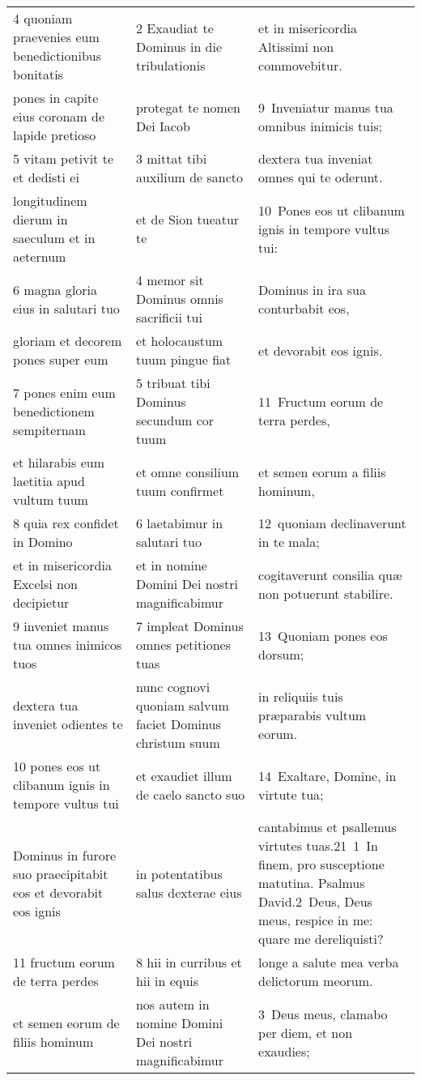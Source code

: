 \documentclass{article}
\begin{document}
\begin{longtable}{@{}p{}p{}p{}@{}}
4 quoniam praevenies eum benedictionibus bonitatis	&	2 Exaudiat te Dominus in die tribulationis	&	et in misericordia Altissimi non commovebitur.	\\
pones in capite eius coronam de lapide pretioso	&	protegat te nomen Dei Iacob	&	9 Inveniatur manus tua omnibus inimicis tuis;	\\
5 vitam petivit te et dedisti ei	&	3 mittat tibi auxilium de sancto	&	dextera tua inveniat omnes qui te oderunt.	\\
longitudinem dierum in saeculum et in aeternum	&	et de Sion tueatur te	&	10 Pones eos ut clibanum ignis in tempore vultus tui:	\\
6 magna gloria eius in salutari tuo	&	4 memor sit Dominus omnis sacrificii tui	&	Dominus in ira sua conturbabit eos,	\\
gloriam et decorem pones super eum	&	et holocaustum tuum pingue fiat	&	et devorabit eos ignis.	\\
7 pones enim eum benedictionem sempiternam	&	5 tribuat tibi Dominus secundum cor tuum	&	11 Fructum eorum de terra perdes,	\\
et hilarabis eum laetitia apud vultum tuum	&	et omne consilium tuum confirmet	&	et semen eorum a filiis hominum,	\\
8 quia rex confidet in Domino	&	6 laetabimur in salutari tuo	&	12 quoniam declinaverunt in te mala;	\\
et in misericordia Excelsi non decipietur	&	et in nomine Domini Dei nostri magnificabimur	&	cogitaverunt consilia quæ non potuerunt stabilire.	\\
9 inveniet manus tua omnes inimicos tuos	&	7 impleat Dominus omnes petitiones tuas	&	13 Quoniam pones eos dorsum;	\\
dextera tua inveniet odientes te	&	nunc cognovi quoniam salvum faciet Dominus christum suum	&	in reliquiis tuis præparabis vultum eorum.	\\
10 pones eos ut clibanum ignis in tempore vultus tui	&	et exaudiet illum de caelo sancto suo	&	14 Exaltare, Domine, in virtute tua;	\\
Dominus in furore suo praecipitabit eos et devorabit eos ignis	&	in potentatibus salus dexterae eius	&	cantabimus et psallemus virtutes tuas.21 1 In finem, pro susceptione matutina. Psalmus David.2 Deus, Deus meus, respice in me: quare me dereliquisti?	\\
11 fructum eorum de terra perdes	&	8 hii in curribus et hii in equis	&	longe a salute mea verba delictorum meorum.	\\
et semen eorum de filiis hominum	&	nos autem in nomine Domini Dei nostri magnificabimur	&	3 Deus meus, clamabo per diem, et non exaudies;	\\

\end{longtable}
\end{document}
